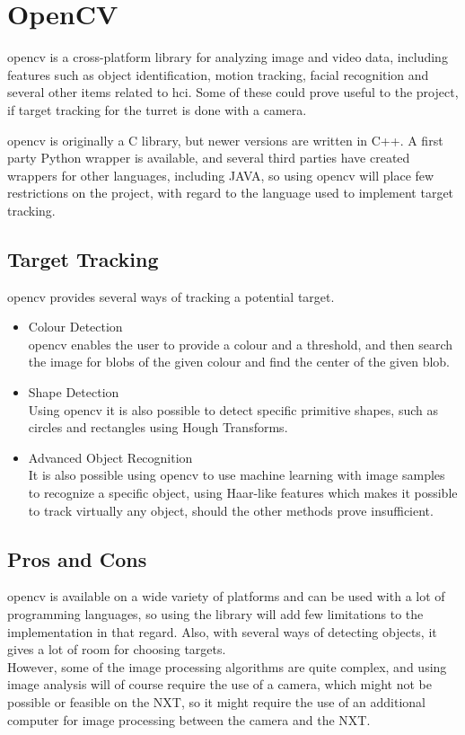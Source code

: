 \section{OpenCV}

\ac{opencv}\cite{opencv} is a cross-platform library for analyzing image and video data, including features such
as object identification, motion tracking, facial recognition and several other items related to \ac{hci}. 
Some of these could prove useful to the project, if target tracking for the turret is done with a camera.

\ac{opencv} is originally a C library, but newer versions are written in C++. A first party Python wrapper is
available, and several third parties have created wrappers for other languages, including JAVA\cite{javacv}, so
using \ac{opencv} will place few restrictions on the project, with regard to the language used to implement
target tracking.

\subsection{Target Tracking}
\ac{opencv} provides several ways of tracking a potential target.
\begin{itemize}
  \item{Colour Detection}\\
  \ac{opencv} enables the user to provide a colour and a threshold, and then search the image for blobs of the
  given colour and find the center of the given blob.
  \item{Shape Detection}\\
  Using \ac{opencv} it is also possible to detect specific primitive shapes, such as circles and rectangles using
  Hough Transforms\cite{hough2003}.
  \item{Advanced Object Recognition}\\
  It is also possible using \ac{opencv} to use machine learning with image samples to recognize a specific
  object, using Haar-like features\cite{lienhart2002} which makes it possible to track virtually any object,
  should the other methods prove insufficient.
\end{itemize}

\subsection{Pros and Cons}
\ac{opencv} is available on a wide variety of platforms and can be used with a lot of programming languages,
so using the library will add few limitations to the implementation in that regard. Also, with several ways
of detecting objects, it gives a lot of room for choosing targets.\\
However, some of the image processing algorithms are quite complex, and using image analysis will of course
require the use of a camera, which might not be possible or feasible on the NXT, so it might require the
use of an additional computer for image processing between the camera and the NXT.

